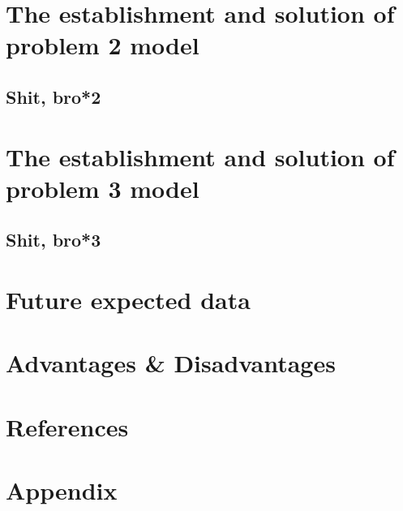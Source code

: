 \documentclass[12pt]{article}
\begin{document}
\section{The establishment and solution of problem 2 model}\label{sec:the-establishment-and-solution-of-problem-2-model} %
	\subsection{Shit, bro*2}\label{subsec:shit-bro*2} %
	
\section{The establishment and solution of problem 3 model}\label{sec:the-establishment-and-solution-of-problem-3-model} %
	\subsection{Shit, bro*3}\label{subsec:shit-bro*3} %
	
\section{Future expected data}\label{sec:future-expected-data} %

\section{Advantages \& Disadvantages}\label{sec:advantages-&-disadvantages} %

\section{References}\label{sec:references} %

\section{Appendix}\label{sec:appendix} %
\end{document}
